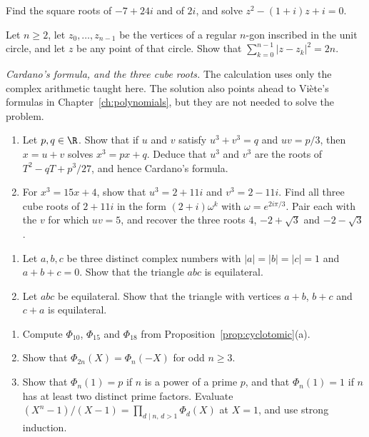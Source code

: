 \begin{exercise}[$\star$]\label{ex:sqrtz}
Find the square roots of $-7+24i$ and of $2i$, and solve $z^2-(1+i)z+i=0$.
\end{exercise}

\begin{exercise}[$\star$]\label{ex:sumdist}
Let $n\ge2$, let $z_0,\dots,z_{n-1}$ be the vertices of a regular $n$-gon inscribed in the unit circle, and let $z$ be any point of that circle. Show that $\sum_{k=0}^{n-1}|z-z_k|^2=2n$.
\end{exercise}

\begin{exercise}[$\star\star$]\label{ex:cardano}
\emph{Cardano's formula, and the three cube roots.} The calculation uses only the complex arithmetic taught here. The solution also points ahead to Vi\`ete's formulas in Chapter~\ref{ch:polynomials}, but they are not needed to solve the problem.
\begin{enumerate}[label=(\alph*)]
\item Let $p,q\in\R$. Show that if $u$ and $v$ satisfy $u^3+v^3=q$ and $uv=p/3$, then $x=u+v$ solves $x^3=px+q$. Deduce that $u^3$ and $v^3$ are the roots of $T^2-qT+p^3/27$, and hence Cardano's formula.
\item For $x^3=15x+4$, show that $u^3=2+11i$ and $v^3=2-11i$. Find all three cube roots of $2+11i$ in the form $(2+i)\omega^k$ with $\omega=e^{2i\pi/3}$. Pair each with the $v$ for which $uv=5$, and recover the three roots $4$, $-2+\sqrt3$ and $-2-\sqrt3$.
\end{enumerate}
\end{exercise}

\begin{exercise}[$\star\star$]\label{ex:equi}
\begin{enumerate}[label=(\alph*)]
\item Let $a,b,c$ be three distinct complex numbers with $|a|=|b|=|c|=1$ and $a+b+c=0$. Show that the triangle $abc$ is equilateral.
\item Let $abc$ be equilateral. Show that the triangle with vertices $a+b$, $b+c$ and $c+a$ is equilateral.
\end{enumerate}
\end{exercise}

\begin{exercise}[$\star\star$]\label{ex:cyclo}
\begin{enumerate}[label=(\alph*)]
\item Compute $\Phi_{10}$, $\Phi_{15}$ and $\Phi_{18}$ from Proposition~\ref{prop:cyclotomic}(a).
\item Show that $\Phi_{2n}(X)=\Phi_n(-X)$ for odd $n\ge3$.
\item Show that $\Phi_n(1)=p$ if $n$ is a power of a prime $p$, and that $\Phi_n(1)=1$ if $n$ has at least two distinct prime factors. Evaluate $(X^n-1)/(X-1)=\prod_{d\mid n,\,d>1}\Phi_d(X)$ at $X=1$, and use strong induction.
\end{enumerate}
\end{exercise}

